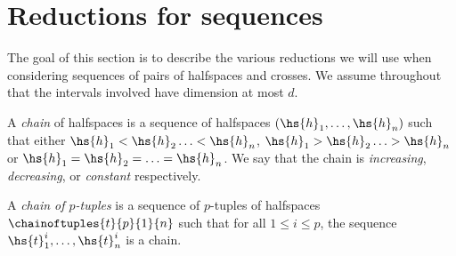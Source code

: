 
\section{Reductions for sequences}

The goal of this section is to describe the various reductions we will use when considering sequences of pairs of halfspaces and crosses. We assume throughout that the intervals involved have dimension at most $d$.



 A \emph{chain} of halfspaces is a sequence of halfspaces $(\hs{h}_1,\ldots,\hs{h}_n)$ such that either $\hs{h}_1<\hs{h}_2\ldots<\hs{h}_n$, $\hs{h}_1>\hs{h}_2\ldots>\hs{h}_n$ or $\hs{h}_1=\hs{h}_2=\ldots=\hs{h}_n$. We say that the chain is \emph{increasing}, \emph{decreasing}, or \emph{constant} respectively.
 
 A \emph{chain of $p$-tuples} is a sequence of $p$-tuples of halfspaces $\chainoftuples{t}{p}{1}{n}$ such that for all $1\leq i\leq p$, the sequence $\hs{t}^i_1,\ldots,\hs{t}^i_n$ is a chain.
 
